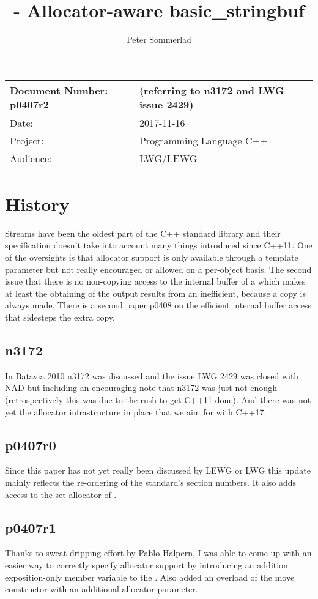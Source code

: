 \documentclass[ebook,11pt,article]{memoir}
\title{\papernumber{} - Allocator-aware basic\_stringbuf}
\author{Peter Sommerlad}
\date{\paperdate}                        %
\newcommand{\papernumber}{p0407r2}
\newcommand{\paperdate}{2017-11-16}
\begin{document}
\maketitle
\begin{tabular}[t]{|l|l|}\hline 
Document Number: \papernumber &   (referring to n3172 and LWG issue 2429)\\\hline
Date: & \paperdate \\\hline
Project: & Programming Language C++\\\hline 
Audience: & LWG/LEWG\\\hline
\end{tabular}

\chapter{History}



Streams have been the oldest part of the C++ standard library and their specification doesn't take into account many things introduced since C++11. One of  the oversights is that allocator support is only available through a template parameter but not really encouraged or allowed on a per-object basis. The second issue that there is no non-copying access to the internal buffer of a  which makes at least the obtaining of the output results from an  inefficient, because a copy is always made. There is a second paper p0408 on the efficient internal buffer access that sidesteps the extra copy.
\section{n3172}
In Batavia 2010 n3172 was discussed and the issue LWG 2429 was closed with NAD but including an encouraging note that n3172 was just not enough (retrospectively this was due to the rush to get C++11 done). And there was not yet the allocator infrastructure in place that we aim for with C++17.
\section{p0407r0}
Since this paper has not yet really been discussed by LEWG or LWG this update mainly reflects the re-ordering of the standard's section numbers. It also adds access to the set allocator of .
\section{p0407r1}
Thanks to sweat-dripping effort by Pablo Halpern, I was able to come up with an easier way to correctly specify allocator support by introducing an addition exposition-only  member variable to the . Also added an overload of the move constructor with an additional allocator parameter.
\end{document}
